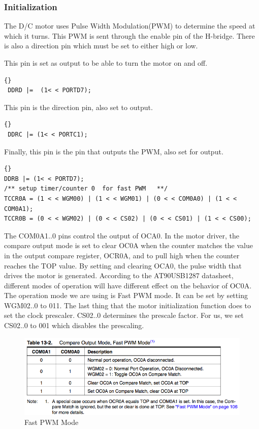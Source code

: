 \subsubsection{Initialization}
The D/C motor uses Pulse Width Modulation(PWM) to determine the speed at which it turns. This PWM is sent through the enable pin of the H-bridge. There is also a direction pin which must be set to either high or low.

This pin is set as output to be able to turn the motor on and off.
\lstset{language=c}
\lstset{commentstyle=\textit}
\begin{lstlisting}[frame=trbl]{}
 DDRD |=  (1< < PORTD7);
\end{lstlisting}

This pin is the direction pin, also set to output. 

\lstset{language=c}
\lstset{commentstyle=\textit}
\begin{lstlisting}[frame=trbl]{}
 DDRC |= (1< < PORTC1);
\end{lstlisting}

Finally, this pin is the pin that outputs the PWM, also set for output. 

\lstset{language=c}
\lstset{commentstyle=\textit}
\begin{lstlisting}[frame=trbl]{}
DDRB |= (1< < PORTD7);
/** setup timer/counter 0  for fast PWM   **/ 
TCCR0A = (1 < < WGM00) | (1 < < WGM01) | (0 < < COM0A0) | (1 < < COM0A1);
TCCR0B = (0 < < WGM02) | (0 < < CS02) | (0 < < CS01) | (1 < < CS00);
\end{lstlisting}

The COM0A1..0 pins control the output of OCA0. In the motor driver, the compare output mode is set to clear OC0A when the counter matches the value in the output compare register, OCR0A, and to pull high when the counter reaches the TOP value. By setting and clearing OCA0, the pulse width that drives the motor is generated. According to the AT90USB1287 datasheet, different modes of operation will have different effect on the behavior of OC0A. The operation mode we are using is Fast PWM mode. It can be set by setting WGM02..0 to 011. The last thing that the motor initialization function does to set the clock prescaler. CS02..0 determines the prescale factor. For us, we set CS02..0 to 001 which disables the prescaling.

\begin{figure}[h]
  \begin{center}
    \includegraphics[width=125mm]{imageSources/pwmTable1.png}
  \end{center}
  \caption{Fast PWM Mode} 
  \label{pwmTable1}
\end{figure}

